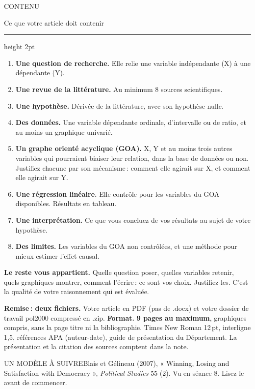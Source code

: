 \documentclass[11pt]{article}
\newcommand{\etape}[2]{%
  \par\vspace{10pt}\Needspace{4\baselineskip}%
  {\titre\small\color{rouge}#1}\par\vspace{-2pt}%
  {\titre\Large #2}\par\vspace{3pt}%
  {\color{encre}\hrule height 2pt}\vspace{6pt}}
\newcommand{\code}[1]{{\setlength{\fboxsep}{1.6pt}\colorbox{codefond}{\ttfamily\small #1}}}
\begin{document}
\etape{CONTENU}{Ce que votre article doit contenir}

\begin{enumerate}[itemsep=2pt]
\item \textbf{Une question de recherche.} Elle relie une variable indépendante (X) à une dépendante (Y).
\item \textbf{Une revue de la littérature.} Au minimum 8 sources scientifiques.
\item \textbf{Une hypothèse.} Dérivée de la littérature, avec son hypothèse nulle.
\item \textbf{Des données.} Une variable dépendante ordinale, d'intervalle ou de ratio, et au moins un graphique univarié.
\item \textbf{Un graphe orienté acyclique (GOA).} X, Y et au moins trois autres variables qui pourraient biaiser leur relation, dans la base de données ou non. Justifiez chacune par son mécanisme : comment elle agirait sur X, et comment elle agirait sur Y.
\item \textbf{Une régression linéaire.} Elle contrôle pour les variables du GOA disponibles. Résultats en tableau.
\item \textbf{Une interprétation.} Ce que vous concluez de vos résultats au sujet de votre hypothèse.
\item \textbf{Des limites.} Les variables du GOA non contrôlées, et une méthode pour mieux estimer l'effet causal.
\end{enumerate}

\begin{regle}
\textbf{Le reste vous appartient.} Quelle question poser, quelles variables retenir, quels graphiques montrer, comment l'écrire : ce sont vos choix. Justifiez-les. C'est la qualité de votre raisonnement qui est évaluée.
\end{regle}

\textbf{Remise : deux fichiers.} Votre article en PDF (pas de .docx) et votre dossier de travail \code{pol2000} compressé en .zip. \textbf{Format.} \textbf{9 pages au maximum}, graphiques compris, sans la page titre ni la bibliographie. Times New Roman 12\,pt, interligne 1,5, références APA (auteur-date), guide de présentation du Département. La présentation et la citation des sources comptent dans la note.

\begin{cadre}
\raggedright{\titre\small\color{rouge}UN MODÈLE À SUIVRE}\hspace{0.6em}Blais et Gélineau (2007), « Winning, Losing and Satisfaction with Democracy », \textit{Political Studies} 55 (2). Vu en séance 8. Lisez-le avant de commencer.
\end{cadre}
\end{document}
